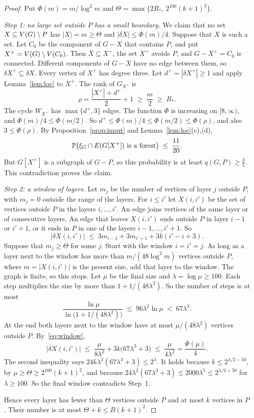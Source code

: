 \begin{proof}
Put $\Phi(m)=m/\log^{2}m$ and $\Theta=\max\{2R_{*},\,2^{100}(k+1)^{2}\}$.

\emph{Step 1: no large set outside $P$ has a small boundary.} We claim that no set
$X\subseteq V(G)\setminus P$ has $|X|=m\ge\Theta$ and $|\delta X|\le\Phi(m)/4$. Suppose that $X$ is such a
set. Let $C_0$ be the component of $G-X$ that contains $P$, and put $X^{+}=V(G)\setminus V(C_0)$. Then
$X\subseteq X^{+}$, the set $X^{+}$ avoids $P$, and $G-X^{+}=C_0$ is connected. Different components
of $G-X$ have no edge between them, so $\delta X^{+}\subseteq\delta X$. Every vertex of $X^{+}$ has
degree three. Let $d^{+}=|\delta X^{+}|\ge1$ and apply Lemma~\ref{lem:loc} to $X^{+}$. The rank of
$G_{X^{+}}$ is
\[
  \rho=\frac{|X^{+}|+d^{+}}2+1\;\ge\;\frac m2\;\ge\;R_{*}.
\]
The cycle $W_{X^{+}}$ has $\max\{d^{+},3\}$ edges. The function $\Phi$ is increasing on
$[8,\infty)$, and $\Phi(m)/4\le\Phi(m/2)$. So
$d^{+}\le\Phi(m)/4\le\Phi(m/2)\le\Phi(\rho)$, and also $3\le\Phi(\rho)$. By
Proposition~\ref{prop:input} and
Lemma~\ref{lem:loc}(c),(d),
\[
  \mathbb{P}\bigl(\xi_G\cap E(G[X^{+}])\text{ is a forest}\bigr)\;\le\;\frac{11}{20}.
\]
But $G[X^{+}]$ is a subgraph of $G-P$, so this probability is at least $q(G,P)\ge\frac35$. This
contradiction proves the claim.

\emph{Step 2: a window of layers.} Let $m_j$ be the number of vertices of layer $j$ outside $P$, with
$m_j=0$ outside the range of the layers. For $i\le i'$ let $X(i,i')$ be the set of vertices outside
$P$ in the layers $i,\dots,i'$. An edge joins vertices of the same layer or of consecutive layers.
An edge that leaves $X(i,i')$ ends outside $P$ in layer $i-1$ or $i'+1$, or it ends in $P$ in one of
the layers $i-1,\dots,i'+1$. So
\begin{equation}\label{eq:window}
  |\delta X(i,i')|\;\le\;3m_{i-1}+3m_{i'+1}+3k(i'-i+3).
\end{equation}
Suppose that $m_j\ge\Theta$ for some $j$. Start with the window $i=i'=j$. As long as a layer next
to the window has more than $m/(48\log^{2}m)$ vertices outside $P$, where $m=|X(i,i')|$ is the
present size, add that layer to the window. The graph is finite, so this stops. Let $\mu$ be the
final size and $\lambda=\log\mu\ge100$. Each step multiplies the size by more than
$1+1/(48\lambda^{2})$. So the number of steps is at most
\[
  \frac{\ln\mu}{\ln\bigl(1+1/(48\lambda^{2})\bigr)}\;\le\;96\lambda^{2}\ln\mu\;<\;67\lambda^{3}.
\]
At the end both layers next to the window have at most $\mu/(48\lambda^{2})$ vertices outside $P$.
By~\eqref{eq:window},
\[
  |\delta X(i,i')|\;\le\;\frac{\mu}{8\lambda^{2}}+3k\bigl(67\lambda^{3}+3\bigr)
  \;\le\;\frac{\mu}{4\lambda^{2}}=\frac{\Phi(\mu)}4 .
\]
The second inequality says $24k\lambda^{2}(67\lambda^{3}+3)\le2^{\lambda}$. It holds because
$k\le2^{\lambda/2-50}$, by $\mu\ge\Theta\ge2^{100}(k+1)^{2}$, and because
$24\lambda^{2}(67\lambda^{3}+3)\le2000\lambda^{5}\le2^{\lambda/2+50}$ for $\lambda\ge100$. So the
final window contradicts Step~1.

Hence every layer has fewer than $\Theta$ vertices outside $P$ and at most $k$ vertices in $P$. Their
number is at most $\Theta+k\le B(k+1)^{2}$.
\end{proof}

